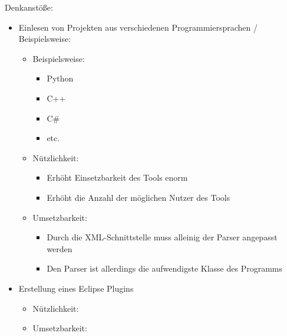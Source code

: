 Denkanstöße:
\begin{itemize}
	\item Einlesen von Projekten aus verschiedenen Programmiersprachen / Beispielsweise:
	\begin{itemize}
		\item Beispielsweise:
		\begin{itemize}
			\item Python
			\item C++
			\item C#
			\item etc.
		\end{itemize}
			\item Nützlichkeit:
		\begin{itemize}
			\item Erhöht Einsetzbarkeit des Tools enorm
			\item Erhöht die Anzahl der möglichen Nutzer des Tools
		\end{itemize}
			\item Umsetzbarkeit:
		\begin{itemize}
			\item Durch die XML-Schnittstelle muss alleinig der Parser angepasst werden
			\item Den Parser ist allerdings die aufwendigste Klasse des Programms
		\end{itemize}
	\end{itemize}
	\item Erstellung eines Eclipse Plugins
	\begin{itemize}
		\item Nützlichkeit:
		\begin{itemize}
		\end{itemize}
			\item Umsetzbarkeit:
		\begin{itemize}
		\end{itemize}
	\end{itemize}
	
\end{itemize}
\nsecend

    
     


